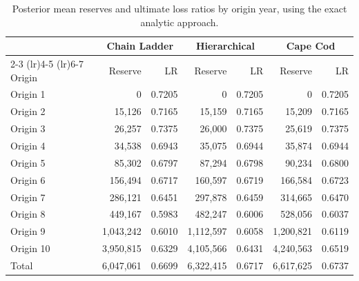 \documentclass[11pt]{article}
\newcommand{\1}{\mathbf{1}}
\begin{document}
\begin{table}[htbp]
\centering
\begin{tabular}{lrrrrrr}
\toprule
 & \multicolumn{2}{c}{Chain Ladder} & \multicolumn{2}{c}{Hierarchical} & \multicolumn{2}{c}{Cape Cod} \\
\cmidrule(lr){2-3} \cmidrule(lr){4-5} \cmidrule(lr){6-7}
Origin & Reserve & LR & Reserve & LR & Reserve & LR \\
\midrule
Origin 1 & 0 & 0.7205 & 0 & 0.7205 & 0 & 0.7205 \\
Origin 2 & 15,126 & 0.7165 & 15,159 & 0.7165 & 15,209 & 0.7165 \\
Origin 3 & 26,257 & 0.7375 & 26,000 & 0.7375 & 25,619 & 0.7375 \\
Origin 4 & 34,538 & 0.6943 & 35,075 & 0.6944 & 35,874 & 0.6944 \\
Origin 5 & 85,302 & 0.6797 & 87,294 & 0.6798 & 90,234 & 0.6800 \\
Origin 6 & 156,494 & 0.6717 & 160,597 & 0.6719 & 166,584 & 0.6723 \\
Origin 7 & 286,121 & 0.6451 & 297,878 & 0.6459 & 314,665 & 0.6470 \\
Origin 8 & 449,167 & 0.5983 & 482,247 & 0.6006 & 528,056 & 0.6037 \\
Origin 9 & 1,043,242 & 0.6010 & 1,112,597 & 0.6058 & 1,200,821 & 0.6119 \\
Origin 10 & 3,950,815 & 0.6329 & 4,105,566 & 0.6431 & 4,240,563 & 0.6519 \\
Total & 6,047,061 & 0.6699 & 6,322,415 & 0.6717 & 6,617,625 & 0.6737 \\
\bottomrule
\end{tabular}
\caption{Posterior mean reserves and ultimate loss ratios by origin year, using the exact analytic approach.}
\label{tab:saluz_results}
\end{table}
\end{document}
